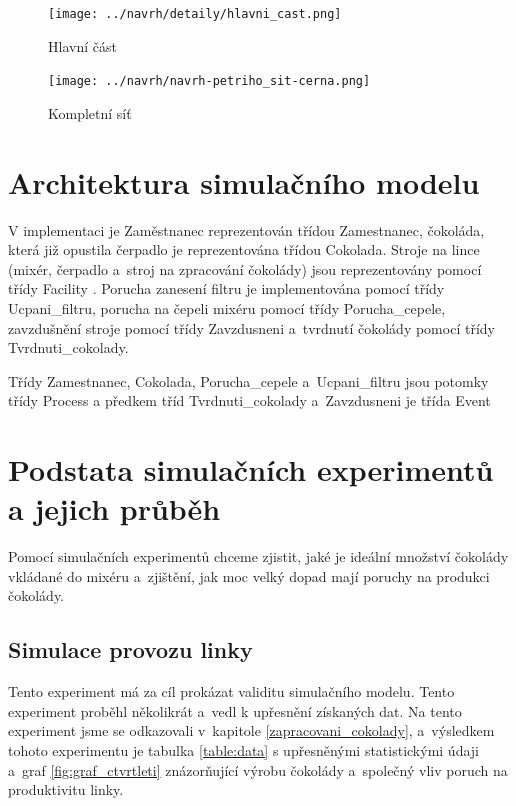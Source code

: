 \documentclass[11pt,a4paper,titlepage]{article}
\begin{document}
		\begin{figure}
			\begin{center}
				\texttt{[image: ../navrh/detaily/hlavni\_cast.png]}
				\caption{Hlavní část}
				\label{fig:sit-hlavni}
			\end{center}
		\end{figure}

		\begin{figure}
		\begin{center}
			\texttt{[image: ../navrh/navrh-petriho\_sit-cerna.png]}
			\caption{Kompletní síť}
			\label{fig:sit-komplet}
		\end{center}
		\end{figure}

	\newpage
	\section{Architektura simulačního modelu}
		V implementaci je Zaměstnanec reprezentován třídou Zamestnanec, čokoláda, která
		již opustila čerpadlo je reprezentována třídou Cokolada. Stroje na lince (mixér, čerpadlo a~stroj na zpracování čokolády)
		jsou reprezentovány pomocí třídy Facility \cite[strana 180]{web:prednasky}.
		Porucha zanesení filtru je implementována pomocí třídy Ucpani\_filtru, porucha na
		čepeli mixéru pomocí třídy Porucha\_cepele, zavzdušnění stroje pomocí třídy
		Zavzdusneni a~tvrdnutí čokolády pomocí třídy Tvrdnuti\_cokolady.

		Třídy Zamestnanec, Cokolada, Porucha\_cepele a~Ucpani\_filtru jsou potomky třídy Process \cite[strana 171]{web:prednasky}
		a předkem tříd Tvrdnuti\_cokolady a~Zavzdusneni je třída Event \cite[strana 169]{web:prednasky}

	\section{Podstata simulačních experimentů a jejich průběh}
		Pomocí simulačních experimentů \cite[strana 9]{web:prednasky} chceme zjistit, jaké je ideální množství
		čokolády vkládané do mixéru a~zjištění, jak moc velký dopad mají poruchy na produkci
		čokolády.

		\subsection{Simulace provozu linky}
			Tento experiment \cite[strana 9]{web:prednasky} má za cíl prokázat validitu simulačního modelu. Tento experiment
			proběhl několikrát a~vedl k upřesnění získaných dat. Na tento experiment jsme se
			odkazovali v~kapitole \ref{zapracovani_cokolady}, a~výsledkem tohoto experimentu
			je tabulka \ref{table:data} s upřesněnými statistickými údaji a~graf \ref{fig:graf_ctvrtleti}
			znázorňující výrobu čokolády a~společný vliv poruch na produktivitu linky.
\end{document}
